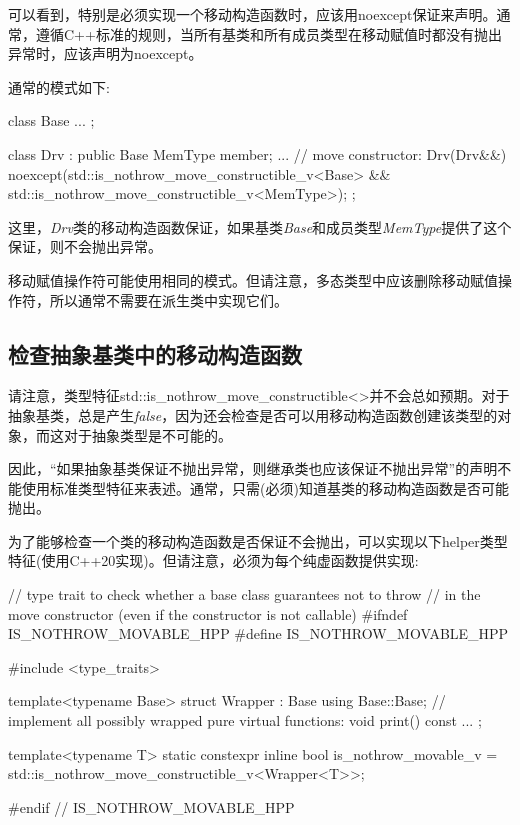 可以看到，特别是必须实现一个移动构造函数时，应该用noexcept保证来声明。通常，遵循C++标准的规则，当所有基类和所有成员类型在移动赋值时都没有抛出异常时，应该声明为noexcept。

通常的模式如下:

\begin{cppcode}
class Base {
	...
};

class Drv : public Base {
	MemType member;
	...
	// move constructor:
	Drv(Drv&&) noexcept(std::is_nothrow_move_constructible_v<Base> &&
	std::is_nothrow_move_constructible_v<MemType>);
};
\end{cppcode}

这里，\textit{Drv}类的移动构造函数保证，如果基类\textit{Base}和成员类型\textit{MemType}提供了这个保证，则不会抛出异常。

移动赋值操作符可能使用相同的模式。但请注意，多态类型中应该删除移动赋值操作符，所以通常不需要在派生类中实现它们。

\subsection{检查抽象基类中的移动构造函数}

请注意，类型特征std::is_nothrow_move_constructible<>并不会总如预期。对于抽象基类，总是产生\textit{false}，因为还会检查是否可以用移动构造函数创建该类型的对象，而这对于抽象类型是不可能的。

因此，“如果抽象基类保证不抛出异常，则继承类也应该保证不抛出异常”的声明不能使用标准类型特征来表述。通常，只需(必须)知道基类的移动构造函数是否可能抛出。

为了能够检查一个类的移动构造函数是否保证不会抛出，可以实现以下helper类型特征(使用C++20实现)。但请注意，必须为每个纯虚函数提供实现:

\begin{cppcode}
// type trait to check whether a base class guarantees not to throw
// in the move constructor (even if the constructor is not callable)
#ifndef IS_NOTHROW_MOVABLE_HPP
#define IS_NOTHROW_MOVABLE_HPP

#include <type_traits>

template<typename Base>
struct Wrapper : Base {
	using Base::Base;
	// implement all possibly wrapped pure virtual functions:
	void print() const {}
	...
};

template<typename T>
static constexpr inline bool is_nothrow_movable_v
	= std::is_nothrow_move_constructible_v<Wrapper<T>>;

#endif // IS_NOTHROW_MOVABLE_HPP
\end{cppcode}

